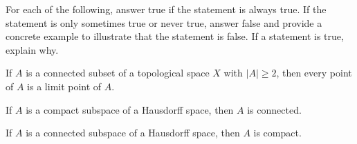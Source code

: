 \begin{comment}
\item[20.] Every nonempty open set contains $a$, and so $X$ cannot be written as a disjoint union of open sets. Thus, $X$ is connected. 

\item[21.] In this case $X = \{a\} \cup \{b,c,d\}$ and $X$ is disconnected. 

\item[23.] Every nonempty open set contains $a$, and so $X$ cannot be written as a disjoint union of open sets. Thus, $X$ is connected.  

\item[24.] In this case $X = \{a,b\} \cup \{c,d\}$ and $X$ is disconnected. 

\item[25.] Every nonempty open set contains $a$, and so $X$ cannot be written as a disjoint union of open sets. Thus, $X$ is connected. 

\item[27.] In this case $X = \{a\} \cup \{b,c,d\}$ and $X$ is disconnected. 

\item[29.] In this case $X = \{a,b\} \cup \{c,d\}$ and $X$ is disconnected. 

\item[31.] The only open sets that contains $d$ are $\{a,b,d\}$ and $X$, and each of these sets has a nontrivial intersection with every other open set. So $X$ cannot be written as a union of disjoint open sets and $X$ is connected. 

\end{enumerate}

\end{comment}


\item For each of the following, answer true if the statement is always true. If the statement is only sometimes true or never true, answer false and provide a concrete example to illustrate that the statement is false. If a statement is true, explain why. 
	\ba
	\item If $A$ is a connected subset of a topological space $X$ with $|A| \geq 2$, then every point of $A$ is a limit point of $A$.

\item If $A$ is a compact subspace of a Hausdorff space, then $A$ is connected.

\item If $A$ is a connected subspace of a Hausdorff space, then $A$ is compact.

